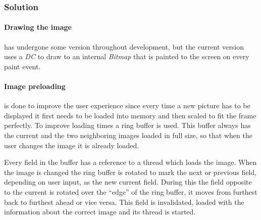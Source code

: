\subsubsection{Solution} %

\paragraph{Drawing the image} has undergone some version throughout development,
but the current version uses a \emph{DC} to draw to an internal \emph{Bitmap}
that is painted to the screen on every paint event.

\paragraph{Image preloading} is done to improve the user experience since every
time a new picture has to be displayed it first needs to be loaded into memory
and then scaled to fit the frame perfectly. To improve loading times a ring
buffer is used. This buffer always has the current and the two neighboring
images loaded in full size, so that when the user changes the image it is
already loaded.

Every field in the buffer has a reference to a thread which loads the image.
When the image is changed the ring buffer is rotated to mark the next or
previous field, depending on user input, as the new current field. During this
the field opposite to the current is rotated over the ``edge'' of the ring
buffer, it moves from furthest back to furthest ahead or vice versa. This field
is invalidated, loaded with the information about the correct image and its
thread is started.

